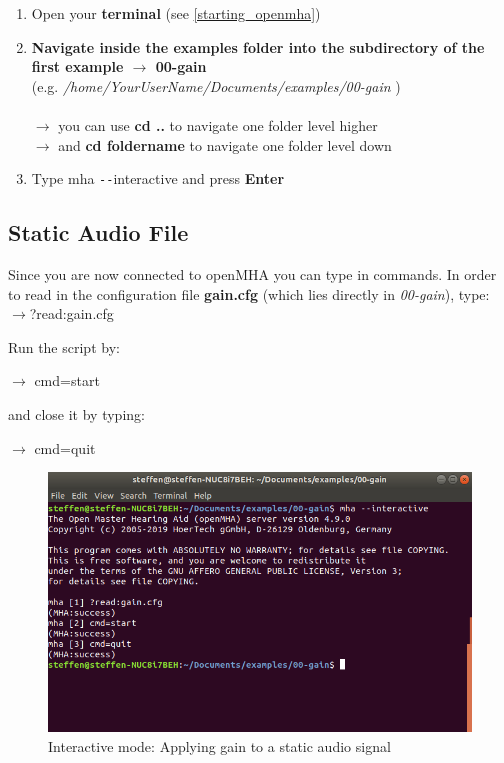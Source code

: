 \documentclass[11pt,a4paper,twoside]{article}
\newcommand{\+}{\discretionary{\mbox{\scriptsize$\hookleftarrow$}}{}{}}
\begin{document}
{{{\begin{enumerate}
    
    \item Open your \textbf{terminal} (see \ref{starting_openmha})
    \item \textbf{Navigate inside the examples folder into the subdirectory of the first example $\rightarrow$ \textbf{00-gain}} \\ (e.g. \textit{/home/YourUserName/Documents/examples/00-gain} )\\ \\
    $\rightarrow$ you can use \textbf{cd ..} to navigate one folder level higher \\
    $\rightarrow$ and \textbf{cd foldername} to navigate one folder level down
    \item Type {{\ttfamily mha \texttt{-{}-}interactive}} and press \textbf{Enter}
\end{enumerate}

\subsection{Static Audio File}

Since you are now connected to openMHA you can type in commands. In order to read in the configuration file \textbf{gain.cfg} (which lies directly in \textit{00-gain}), type: \\

$\rightarrow${\ttfamily ?read:gain.cfg}


Run the script by:

$\rightarrow$ {\ttfamily cmd=start}

and close it by typing:

$\rightarrow$ {\ttfamily cmd=quit} 
\\

\begin{figure}[H]
\centering
\includegraphics[scale=0.4]{static_gain.png}
\caption{Interactive mode: Applying gain to a static audio signal}
\end{figure}

}}}
\end{document}
